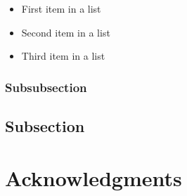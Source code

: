 \documentclass[fleqn,10pt]{SelfArx} %
\begin{document}
\lipsum[13] %

\begin{itemize}[noitemsep] %
\item First item in a list
\item Second item in a list
\item Third item in a list
\end{itemize}

\subsubsection{Subsubsection}

\lipsum[14] %

\subsection{Subsection}

\lipsum[15-23] %

\section*{Acknowledgments} %








\end{document}
